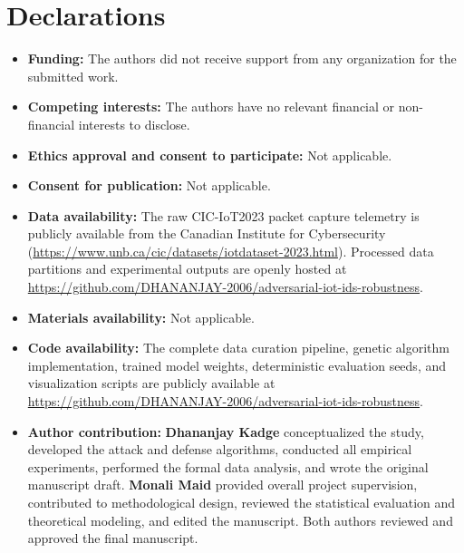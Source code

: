 \documentclass[iicol,pdflatex,sn-mathphys-num]{sn-jnl}
\begin{document}
\section*{Declarations}

\begin{itemize}
\item \textbf{Funding:} The authors did not receive support from any organization for the submitted work.
\item \textbf{Competing interests:} The authors have no relevant financial or non-financial interests to disclose.
\item \textbf{Ethics approval and consent to participate:} Not applicable.
\item \textbf{Consent for publication:} Not applicable.
\item \textbf{Data availability:} The raw CIC-IoT2023 packet capture telemetry is publicly available from the Canadian Institute for Cybersecurity (\url{https://www.unb.ca/cic/datasets/iotdataset-2023.html}). Processed data partitions and experimental outputs are openly hosted at \url{https://github.com/DHANANJAY-2006/adversarial-iot-ids-robustness}.
\item \textbf{Materials availability:} Not applicable.
\item \textbf{Code availability:} The complete data curation pipeline, genetic algorithm implementation, trained model weights, deterministic evaluation seeds, and visualization scripts are publicly available at \url{https://github.com/DHANANJAY-2006/adversarial-iot-ids-robustness}.
\item \textbf{Author contribution:} \textbf{Dhananjay Kadge} conceptualized the study, developed the attack and defense algorithms, conducted all empirical experiments, performed the formal data analysis, and wrote the original manuscript draft. \textbf{Monali Maid} provided overall project supervision, contributed to methodological design, reviewed the statistical evaluation and theoretical modeling, and edited the manuscript. Both authors reviewed and approved the final manuscript.
\end{itemize}


\end{document}
